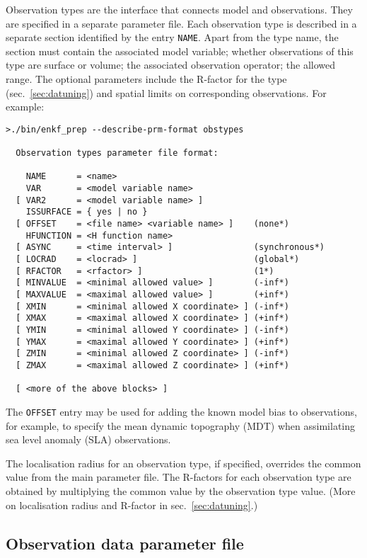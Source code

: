 \documentclass[11pt]{report}
\begin{document}
Observation types are the interface that connects model and observations.
They are specified in a separate parameter file.
Each observation type is described in a separate section identified by the entry \verb|NAME|.
Apart from the type name, the section must contain the associated model variable; whether observations of this type are surface or volume; the associated observation operator; the allowed range.
The optional parameters include the R-factor for the type (sec.~\ref{sec:datuning}) and spatial limits on corresponding observations.
For example:
\begin{Verbatim}[frame=single,fontsize=\footnotesize]
>./bin/enkf_prep --describe-prm-format obstypes

  Observation types parameter file format:

    NAME      = <name>
    VAR       = <model variable name>
  [ VAR2      = <model variable name> ]
    ISSURFACE = { yes | no }
  [ OFFSET    = <file name> <variable name> ]    (none*)
    HFUNCTION = <H function name>
  [ ASYNC     = <time interval> ]                (synchronous*)
  [ LOCRAD    = <locrad> ]                       (global*)
  [ RFACTOR   = <rfactor> ]                      (1*)
  [ MINVALUE  = <minimal allowed value> ]        (-inf*)
  [ MAXVALUE  = <maximal allowed value> ]        (+inf*)
  [ XMIN      = <minimal allowed X coordinate> ] (-inf*)
  [ XMAX      = <maximal allowed X coordinate> ] (+inf*)
  [ YMIN      = <minimal allowed Y coordinate> ] (-inf*)
  [ YMAX      = <maximal allowed Y coordinate> ] (+inf*)
  [ ZMIN      = <minimal allowed Z coordinate> ] (-inf*)
  [ ZMAX      = <maximal allowed Z coordinate> ] (+inf*)

  [ <more of the above blocks> ]
\end{Verbatim}

The \verb|OFFSET| entry may be used for adding the known model bias to observations, for example, to specify the mean dynamic topography (MDT) when assimilating sea level anomaly (SLA) observations.

The localisation radius for an observation type, if specified, overrides the
common value from the main parameter file.
The R-factors for each observation type are obtained by multiplying the common
value by the observation type value.
(More on localisation radius and R-factor in sec.~\ref{sec:datuning}.)

\subsection{Observation data parameter file}
\end{document}
